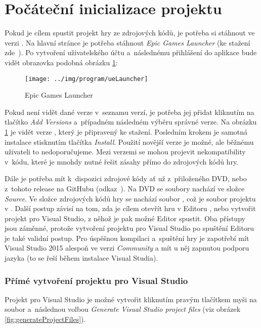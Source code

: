 
\section{Počáteční inicializace projektu}

Pokud je cílem spustit projekt hry ze zdrojových kódů, je potřeba si stáhnout \UE{} ve verzi . Na hlavní stránce \UE{} je potřeba stáhnout \textit{Epic Games Launcher} (ke stažení zde~\citep{ue_download}). Po vytvoření uživatelského účtu a~následnému přihlášení do aplikace bude vidět obrazovka podobná obrázku \ref{fig:ueLauncher}:


\begin{figure}[!ht]\centering
\texttt{[image: ../img/program/ueLauncher]}

\caption{Epic Games Launcher}
\label{fig:ueLauncher}

\end{figure}

\FloatBarrier

Pokud není vidět \UE{} dané verze v~seznamu verzí, je potřeba jej přidat kliknutím na tlačítko \textit{Add Versions} a~případném následném výběru správné verze. Na obrázku \ref{fig:ueLauncher} je vidět \UE{} verze , který je připravený ke stažení. Posledním krokem je samotná instalace stisknutím tlačítka \textit{Install}. Použití novější verze \UEu{} je možné, ale běžnému uživateli to nedoporučujeme. Mezi verzemi se mohou projevit nekompatibility v~kódu, které je mnohdy nutné řešit zásahy přímo do zdrojových kódů hry.

Dále je potřeba mít k~dispozici zdrojové kódy ať už z~přiloženého DVD, nebo z~tohoto release na GitHubu (odkaz~\citep{gh_finalRelease}). Na DVD se soubory nachází ve složce \textit{Source}. Ve složce zdrojových kódů hry se nachází soubor , což je soubor projektu v \UEu{}. Další postup závisí na tom, zda je cílem otevřít hru v Editoru \UEu{}, nebo vytvořit projekt pro Visual Studio, z něhož je pak možné Editor spustit. Oba přístupy jsou záměnné, protože vytvoření projektu pro Visual Studio po spuštění Editoru je také validní postup. Pro úspěšnou kompilaci a~spuštění hry je zapotřebí mít Visual Studio 2015 alespoň ve verzi \textit{Community} a mít u něj zapnutou podporu jazyka \CPP{} (to se řeší během instalace Visual Studia).
 
\subsubsection{Přímé vytvoření projektu pro Visual Studio}
Projekt pro Visual Studio je možné vytvořit kliknutím pravým tlačítkem myši na soubor  a~následnou volbou \textit{Generate Visual Studio project files} (viz obrázek \ref{fig:generateProjectFiles}). 

